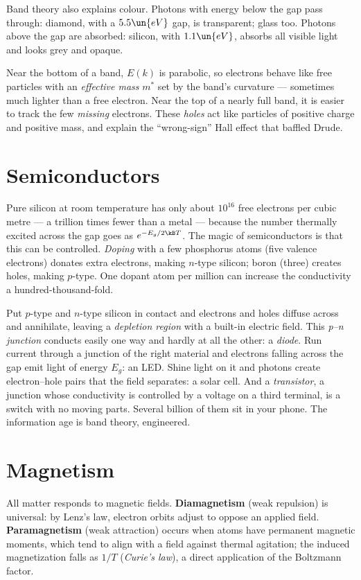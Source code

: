 Band theory also explains colour. Photons with energy below the gap pass through: diamond, with a $5.5\un{eV}$ gap, is transparent; glass too. Photons above the gap are absorbed: silicon, with $1.1\un{eV}$, absorbs all visible light and looks grey and opaque.

Near the bottom of a band, $E(k)$ is parabolic, so electrons behave like free particles with an \emph{effective mass} $m^*$ set by the band's curvature --- sometimes much lighter than a free electron. Near the top of a nearly full band, it is easier to track the few \emph{missing} electrons. These \emph{holes} act like particles of positive charge and positive mass, and explain the ``wrong-sign'' Hall effect that baffled Drude.

\section{Semiconductors}

Pure silicon at room temperature has only about $10^{16}$ free electrons per cubic metre --- a trillion times fewer than a metal --- because the number thermally excited across the gap goes as $e^{-E_g/2\kB T}$. The magic of semiconductors is that this can be controlled. \emph{Doping} with a few phosphorus atoms (five valence electrons) donates extra electrons, making $n$-type silicon; boron (three) creates holes, making $p$-type. One dopant atom per million can increase the conductivity a hundred-thousand-fold.

Put $p$-type and $n$-type silicon in contact and electrons and holes diffuse across and annihilate, leaving a \emph{depletion region} with a built-in electric field. This \emph{p--n junction} conducts easily one way and hardly at all the other: a \emph{diode}. Run current through a junction of the right material and electrons falling across the gap emit light of energy $E_g$: an LED. Shine light on it and photons create electron--hole pairs that the field separates: a solar cell. And a \emph{transistor}, a junction whose conductivity is controlled by a voltage on a third terminal, is a switch with no moving parts. Several billion of them sit in your phone. The information age is band theory, engineered.

\section{Magnetism}

All matter responds to magnetic fields. \textbf{Diamagnetism} (weak repulsion) is universal: by Lenz's law, electron orbits adjust to oppose an applied field. \textbf{Paramagnetism} (weak attraction) occurs when atoms have permanent magnetic moments, which tend to align with a field against thermal agitation; the induced magnetization falls as $1/T$ (\emph{Curie's law}), a direct application of the Boltzmann factor.

